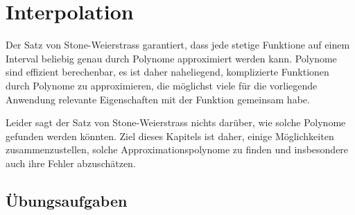 %
%
%
\chapter{Interpolation\label{chapter:interpolation}}
\rhead{}
Der Satz von Stone-Weierstrass garantiert, dass jede stetige Funktione
auf einem Interval beliebig genau durch Polynome approximiert werden
kann.
Polynome sind effizient berechenbar, es ist daher naheliegend,
komplizierte Funktionen durch Polynome zu approximieren, die möglichst
viele für die vorliegende Anwendung relevante Eigenschaften mit der
Funktion gemeinsam habe.

Leider sagt der Satz von Stone-Weierstrass nichts darüber, wie solche
Polynome gefunden werden könnten.
Ziel dieses Kapitels ist daher, einige Möglichkeiten zusammenzustellen,
solche Approximationspolynome zu finden und insbesondere auch ihre
Fehler abzuschätzen.







\section*{Übungsaufgaben}
\begin{uebungsaufgaben}
\end{uebungsaufgaben}
